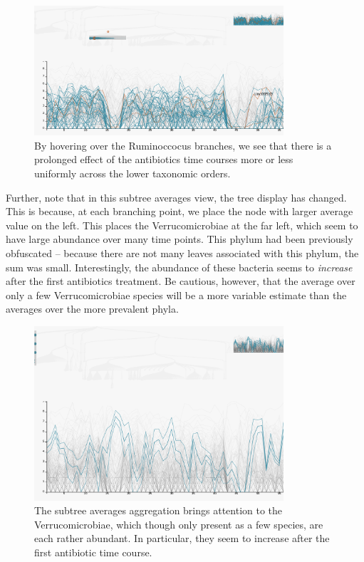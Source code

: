 \documentclass[12pt]{article}
\begin{document}
\begin{figure}

{\centering \includegraphics[width=350px]{figure/ruminococcus}

}

\caption{By hovering over the Ruminoccocus branches, we see that there is a prolonged effect of the antibiotics time courses more or less uniformly across the lower taxonomic orders.}\label{fig:ruminococcus}
\end{figure}

Further, note that in this subtree averages view, the tree display has
changed. This is because, at each branching point, we place the node
with larger average value on the left. This places the Verrucomicrobiae
at the far left, which seem to have large abundance over many time
points. This phylum had been previously obfuscated -- because there are
not many leaves associated with this phylum, the sum was small.
Interestingly, the abundance of these bacteria seems to \emph{increase}
after the first antibiotics treatment. Be cautious, however, that the
average over only a few Verrucomicrobiae species will be a more variable
estimate than the averages over the more prevalent phyla.

\begin{figure}

{\centering \includegraphics[width=350px]{figure/verrucomicrobiae}

}

\caption{The subtree averages aggregation brings attention to the Verrucomicrobiae, which though only present as a few species, are each rather abundant. In particular, they seem to increase after the first antibiotic time course.}\label{fig:verrucomicrobiae}
\end{figure}
\end{document}
